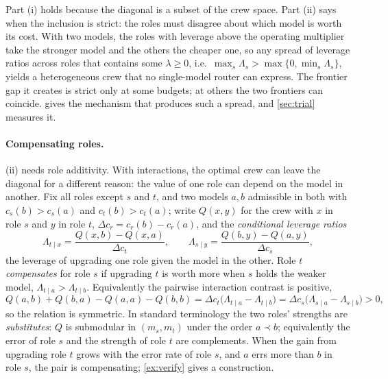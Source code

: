 \documentclass[11pt,a4paper]{article}
\theoremstyle{definition}
\theoremstyle{remark}
\theoremstyle{definition}
\begin{document}
Part (i) holds because the diagonal is a subset of the crew space. Part (ii) says when the inclusion is strict: the roles must disagree about which model is worth its cost. With two models, the roles with leverage above the operating multiplier take the stronger model and the others the cheaper one, so any spread of leverage ratios across roles that contains some $\lambda\ge0$, i.e.\ $\max_s\Lambda_s>\max\{0,\min_s\Lambda_s\}$, yields a heterogeneous crew that no single-model router can express. The frontier gap it creates is strict only at some budgets; at others the two frontiers can coincide.  gives the mechanism that produces such a spread, and \cref{sec:trial} measures it.

\paragraph{Compensating roles.} (ii) needs role additivity. With interactions, the optimal crew can leave the diagonal for a different reason: the value of one role can depend on the model in another. Fix all roles except $s$ and $t$, and two models $a,b$ admissible in both with $c_s(b)>c_s(a)$ and $c_t(b)>c_t(a)$; write $Q(x,y)$ for the crew with $x$ in role $s$ and $y$ in role $t$, $\Delta c_r=c_r(b)-c_r(a)$, and the \emph{conditional leverage ratios}
\[
\Lambda_{t\mid x}=\frac{Q(x,b)-Q(x,a)}{\Delta c_t},\qquad \Lambda_{s\mid y}=\frac{Q(b,y)-Q(a,y)}{\Delta c_s},
\]
the leverage of upgrading one role given the model in the other. Role $t$ \emph{compensates} for role $s$ if upgrading $t$ is worth more when $s$ holds the weaker model, $\Lambda_{t\mid a}>\Lambda_{t\mid b}$. Equivalently the pairwise interaction contrast is positive,
\[
Q(a,b)+Q(b,a)-Q(a,a)-Q(b,b)=\Delta c_t\big(\Lambda_{t\mid a}-\Lambda_{t\mid b}\big)=\Delta c_s\big(\Lambda_{s\mid a}-\Lambda_{s\mid b}\big)>0,
\]
so the relation is symmetric. In standard terminology the two roles' strengths are \emph{substitutes}: $Q$ is submodular in $(m_s,m_t)$ under the order $a\prec b$; equivalently the error of role $s$ and the strength of role $t$ are complements. When the gain from upgrading role $t$ grows with the error rate of role $s$, and $a$ errs more than $b$ in role $s$, the pair is compensating; \cref{ex:verify} gives a construction.
\end{document}
